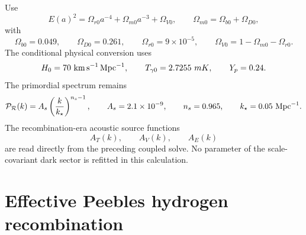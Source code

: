 Use
\begin{equation}
E(a)^2
=
\Omega_{r0}a^{-4}
+\Omega_{m0}a^{-3}
+\Omega_{V0},
\qquad
\Omega_{m0}=\Omega_{b0}+\Omega_{D0},
\label{eq:trl-background}
\end{equation}
with
\begin{equation}
\Omega_{b0}=0.049,
\qquad
\Omega_{D0}=0.261,
\qquad
\Omega_{r0}=9\times10^{-5},
\qquad
\Omega_{V0}=1-\Omega_{m0}-\Omega_{r0}.
\label{eq:trl-fractions}
\end{equation}
The conditional physical conversion uses
\begin{equation}
H_0=70\ {\rm km\,s^{-1}\,Mpc^{-1}},
\qquad
T_{\gamma0}=2.7255\ {
m K},
\qquad
Y_p=0.24.
\label{eq:trl-conventions}
\end{equation}
The primordial spectrum remains
\begin{equation}
\mathcal P_{\mathcal R}(k)
=A_s\left(\frac{k}{k_\star}\right)^{n_s-1},
\qquad
A_s=2.1\times10^{-9},
\qquad
n_s=0.965,
\qquad
k_\star=0.05\ {\rm Mpc}^{-1}.
\label{eq:trl-primordial}
\end{equation}
The recombination-era acoustic source functions
\begin{equation}
A_T(k),\qquad A_V(k),\qquad A_E(k)
\label{eq:trl-parent-sources}
\end{equation}
are read directly from the preceding coupled solve.  No parameter of the scale-covariant dark sector is refitted in this calculation.

\section{Effective Peebles hydrogen recombination}

